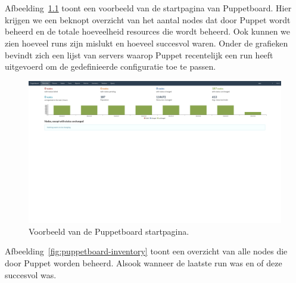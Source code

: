 
\chapter{}%
\label{ch:bijlage_puppetboard}

Afbeelding~\ref{fig:puppetboard-home} toont een voorbeeld van de startpagina van Puppetboard.
Hier krijgen we een beknopt overzicht van het aantal nodes dat door Puppet wordt beheerd en de totale hoeveelheid resources die wordt beheerd.
Ook kunnen we zien hoeveel runs zijn mislukt en hoeveel succesvol waren.
Onder de grafieken bevindt zich een lijst van servers waarop Puppet recentelijk een run heeft uitgevoerd om de gedefinieerde configuratie toe te passen.

\begin{figure}[h!]
    \includegraphics[width=\textwidth]
    {./graphics/state-of-the-art/puppetboard/puppetboard-home.png}
    \caption[Puppetboard startpagina.]{\label{fig:puppetboard-home}Voorbeeld van de Puppetboard startpagina.}
\end{figure}

Afbeelding~\ref{fig:puppetboard-inventory} toont een overzicht van alle nodes die door Puppet worden beheerd.
Alsook wanneer de laatste run was en of deze succesvol was.

